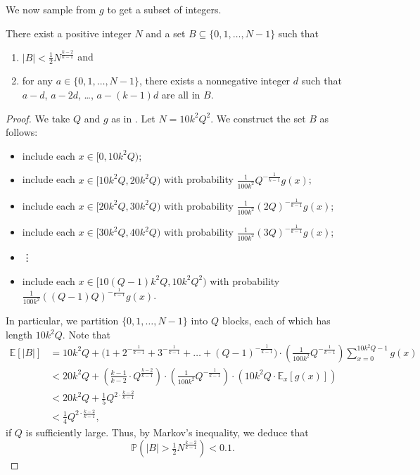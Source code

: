 \documentclass[11pt,reqno]{amsart}
\begin{document}
We now sample from $g$ to get a subset of integers.
\begin{lemma}
\label{lem:sampling}
There exist a positive integer $N$ 
and a set $B\subseteq \{0,1,\dots,N-1\}$
such that 
\begin{enumerate}[label=(\alph*)]
\item $|B| < \frac 12 N^{\frac{k-2}{k-1}}$ and 
\item for any $a\in \{0,1,\dots,N-1\}$, there exists 
a nonnegative integer $d$ such that
$a-d$, $a-2d$, \dots, $a-(k-1)d$ are all in $B$.
\end{enumerate}
\end{lemma}
\begin{proof}
We take $Q$ and $g$ as in .
Let $N=10k^2Q^2$. 
We construct the set $B$ as follows:
\begin{itemize}
    \item include each $x\in [0,10k^2Q)$;
    \item include each $x\in [10k^2Q, 20k^2Q)$ 
    with probability $\frac 1{100k^2} Q^{-\frac 1{k-1}}g(x)$;
    \item include each $x\in [20k^2Q, 30k^2Q)$
    with probability $\frac 1{100k^2} (2Q)^{-\frac 1{k-1}} g(x)$;
    \item include each $x\in [30k^2Q, 40k^2Q)$
    with probability $\frac 1{100k^2} (3Q)^{-\frac 1{k-1}} g(x)$;
    \item \hspace{2cm} \vdots 
    \item include each $x\in [10(Q-1)k^2Q, 10k^2Q^2)$
    with probability $\frac 1{100k^2} ((Q-1)Q)^{-\frac 1{k-1}} g(x)$.
\end{itemize}
In particular, we partition $\{0,1,\dots,N-1\}$ 
into $Q$ blocks, each of which has length $10k^2Q$.
Note that 
\begin{align*}
\mathbb E[|B|] &= 10k^2Q + 
\Big(1+2^{-\frac 1{k-1}}+3^{-\frac 1{k-1}} + \dots + (Q-1)^{-\frac 1{k-1}}\Big)
\cdot \left(\frac 1{100k^2}Q^{-\frac 1{k-1}}\right) \sum_{x=0}^{10k^2Q-1} g(x)\\
&< 20k^2Q  + \left(\frac{k-1}{k-2}\cdot  Q^{\frac{k-2}{k-1}}\right)
\cdot \left(\frac 1{100k^2}  Q^{-\frac 1{k-1}}\right) \cdot 
\left(10k^2Q \cdot \mathbb E_x[g(x)]\right) \\
&< 20k^2 Q + \frac 15 Q^{2\cdot \frac{k-2}{k-1}} \\
&< \frac 14 Q^{2\cdot \frac{k-2}{k-1}},
\end{align*}
if $Q$ is sufficiently large.
Thus, by Markov's inequality, we deduce that 
$$\mathbb P\left(|B| > \tfrac 12 N^{\frac{k-2}{k-1}}\right) < 0.1.$$


\end{proof}
\end{document}
